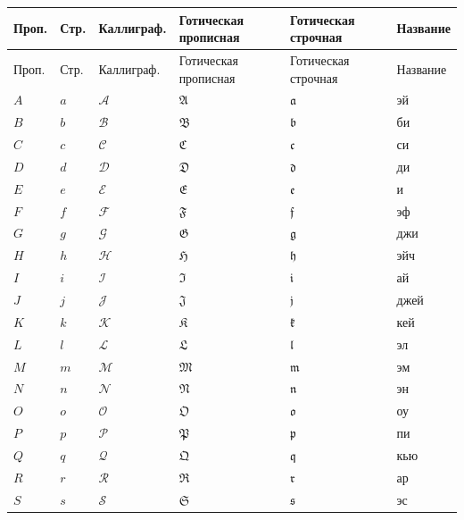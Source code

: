 \begingroup\setlength{\tabcolsep}{3pt}\renewcommand{\arraystretch}{1.1}
\begin{longtable}{|p{.09\linewidth}|p{.09\linewidth}|p{.18\linewidth}|p{.18\linewidth}|p{.18\linewidth}|p{.17\linewidth}|}\hline Проп.&Стр.&Каллиграф.&Готическая прописная&Готическая строчная&Название\\\hline\endfirsthead\hline Проп.&Стр.&Каллиграф.&Готическая прописная&Готическая строчная&Название\\\hline\endhead
\(A\)&\(a\)&\(\mathcal{A}\)&\(\mathfrak{A}\)&\(\mathfrak{a}\)&эй\\\hline
\(B\)&\(b\)&\(\mathcal{B}\)&\(\mathfrak{B}\)&\(\mathfrak{b}\)&би\\\hline
\(C\)&\(c\)&\(\mathcal{C}\)&\(\mathfrak{C}\)&\(\mathfrak{c}\)&си\\\hline
\(D\)&\(d\)&\(\mathcal{D}\)&\(\mathfrak{D}\)&\(\mathfrak{d}\)&ди\\\hline
\(E\)&\(e\)&\(\mathcal{E}\)&\(\mathfrak{E}\)&\(\mathfrak{e}\)&и\\\hline
\(F\)&\(f\)&\(\mathcal{F}\)&\(\mathfrak{F}\)&\(\mathfrak{f}\)&эф\\\hline
\(G\)&\(g\)&\(\mathcal{G}\)&\(\mathfrak{G}\)&\(\mathfrak{g}\)&джи\\\hline
\(H\)&\(h\)&\(\mathcal{H}\)&\(\mathfrak{H}\)&\(\mathfrak{h}\)&эйч\\\hline
\(I\)&\(i\)&\(\mathcal{I}\)&\(\mathfrak{I}\)&\(\mathfrak{i}\)&ай\\\hline
\(J\)&\(j\)&\(\mathcal{J}\)&\(\mathfrak{J}\)&\(\mathfrak{j}\)&джей\\\hline
\(K\)&\(k\)&\(\mathcal{K}\)&\(\mathfrak{K}\)&\(\mathfrak{k}\)&кей\\\hline
\(L\)&\(l\)&\(\mathcal{L}\)&\(\mathfrak{L}\)&\(\mathfrak{l}\)&эл\\\hline
\(M\)&\(m\)&\(\mathcal{M}\)&\(\mathfrak{M}\)&\(\mathfrak{m}\)&эм\\\hline
\(N\)&\(n\)&\(\mathcal{N}\)&\(\mathfrak{N}\)&\(\mathfrak{n}\)&эн\\\hline
\(O\)&\(o\)&\(\mathcal{O}\)&\(\mathfrak{O}\)&\(\mathfrak{o}\)&оу\\\hline
\(P\)&\(p\)&\(\mathcal{P}\)&\(\mathfrak{P}\)&\(\mathfrak{p}\)&пи\\\hline
\(Q\)&\(q\)&\(\mathcal{Q}\)&\(\mathfrak{Q}\)&\(\mathfrak{q}\)&кью\\\hline
\(R\)&\(r\)&\(\mathcal{R}\)&\(\mathfrak{R}\)&\(\mathfrak{r}\)&ар\\\hline
\(S\)&\(s\)&\(\mathcal{S}\)&\(\mathfrak{S}\)&\(\mathfrak{s}\)&эс\\\hline

\end{longtable}

